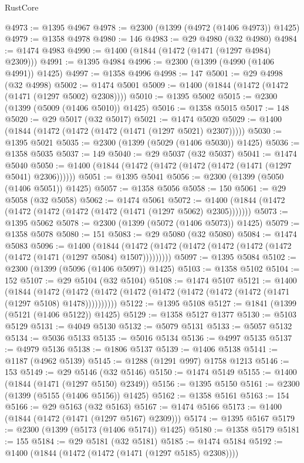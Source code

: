 \begin{lexlean}{RustCore}
\begin{coremodule}
@4973 := @1395 @4967
@4978 := @2300 (@1399 (@4972 (@1406 @4973)) @1425)
@4979 := @1358 @4978
@4980 := 146
@4983 := @29 @4980 (@32 @4980)
@4984 := @1474 @4983
@4990 := @1400 (@1844 (@1472 (@1471 (@1297 @4984) @2309)))
@4991 := @1395 @4984
@4996 := @2300 (@1399 (@4990 (@1406 @4991)) @1425)
@4997 := @1358 @4996
@4998 := 147
@5001 := @29 @4998 (@32 @4998)
@5002 := @1474 @5001
@5009 := @1400 (@1844 (@1472 (@1472 (@1471 (@1297 @5002) @2308))))
@5010 := @1395 @5002
@5015 := @2300 (@1399 (@5009 (@1406 @5010)) @1425)
@5016 := @1358 @5015
@5017 := 148
@5020 := @29 @5017 (@32 @5017)
@5021 := @1474 @5020
@5029 := @1400 (@1844 (@1472 (@1472 (@1472 (@1471 (@1297 @5021) @2307)))))
@5030 := @1395 @5021
@5035 := @2300 (@1399 (@5029 (@1406 @5030)) @1425)
@5036 := @1358 @5035
@5037 := 149
@5040 := @29 @5037 (@32 @5037)
@5041 := @1474 @5040
@5050 := @1400 (@1844 (@1472 (@1472 (@1472 (@1472 (@1471 (@1297 @5041) @2306))))))
@5051 := @1395 @5041
@5056 := @2300 (@1399 (@5050 (@1406 @5051)) @1425)
@5057 := @1358 @5056
@5058 := 150
@5061 := @29 @5058 (@32 @5058)
@5062 := @1474 @5061
@5072 := @1400 (@1844 (@1472 (@1472 (@1472 (@1472 (@1472 (@1471 (@1297 @5062) @2305)))))))
@5073 := @1395 @5062
@5078 := @2300 (@1399 (@5072 (@1406 @5073)) @1425)
@5079 := @1358 @5078
@5080 := 151
@5083 := @29 @5080 (@32 @5080)
@5084 := @1474 @5083
@5096 := @1400
    (@1844 (@1472 (@1472 (@1472 (@1472 (@1472 (@1472 (@1472 (@1471 (@1297 @5084) @1507)))))))))
@5097 := @1395 @5084
@5102 := @2300 (@1399 (@5096 (@1406 @5097)) @1425)
@5103 := @1358 @5102
@5104 := 152
@5107 := @29 @5104 (@32 @5104)
@5108 := @1474 @5107
@5121 := @1400
    (@1844
      (@1472 (@1472 (@1472 (@1472 (@1472 (@1472 (@1472 (@1472 (@1471 (@1297 @5108) @1478))))))))))
@5122 := @1395 @5108
@5127 := @1841 (@1399 (@5121 (@1406 @5122)) @1425)
@5129 := @1358 @5127 @1377
@5130 := @5103 @5129
@5131 := @4049 @5130
@5132 := @5079 @5131
@5133 := @5057 @5132
@5134 := @5036 @5133
@5135 := @5016 @5134
@5136 := @4997 @5135
@5137 := @4979 @5136
@5138 := @1806 @5137
@5139 := @1406 @5138
@5141 := @1187 (@4962 @5139)
@5145 := @1288 (@1291 @997) @1758 @1213
@5146 := 153
@5149 := @29 @5146 (@32 @5146)
@5150 := @1474 @5149
@5155 := @1400 (@1844 (@1471 (@1297 @5150) @2349))
@5156 := @1395 @5150
@5161 := @2300 (@1399 (@5155 (@1406 @5156)) @1425)
@5162 := @1358 @5161
@5163 := 154
@5166 := @29 @5163 (@32 @5163)
@5167 := @1474 @5166
@5173 := @1400 (@1844 (@1472 (@1471 (@1297 @5167) @2309)))
@5174 := @1395 @5167
@5179 := @2300 (@1399 (@5173 (@1406 @5174)) @1425)
@5180 := @1358 @5179
@5181 := 155
@5184 := @29 @5181 (@32 @5181)
@5185 := @1474 @5184
@5192 := @1400 (@1844 (@1472 (@1472 (@1471 (@1297 @5185) @2308))))

\end{coremodule}
\end{lexlean}
